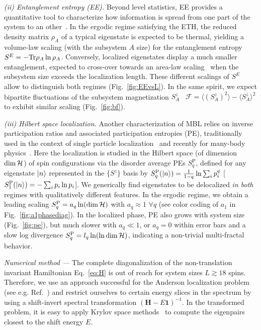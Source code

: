 \documentclass[prl,a4paper,twocolumn,groupedaddress,english,showpacs]{revtex4-1}
\begin{document}
{\it{(ii) Entanglement entropy (EE). }} Beyond level statistics, EE provides a quantitative tool to
characterize how information is spread from one part of the system to an
other~\cite{review_nandkishore}.  In the ergodic regime satisfying the ETH, the reduced density
matrix $\rho_A$  of a typical eigenstate is expected to be thermal, yielding a volume-law scaling
(with the subsystem $A$ size) for the entanglement entropy $S^E=- {\rm Tr} \rho_A \ln \rho_A$.
Conversely, localized eigenstates display a much smaller entanglement, expected to cross-over
towards an area-law scaling~\cite{review_nandkishore,bauer_area_2013} when the subsystem size
exceeds the localization length. These different scalings of $S^E$ allow to distinguish both regimes
(Fig.~\ref{fig:EEvsL}). In the same spirit, we expect bipartite fluctuations of the subsystem
magnetization $S^z_A$~\cite{song_bipartite_2012} $\mathcal{F}=\langle \left( S^z_A \right)^2 \rangle
- \langle S^z_A \rangle^2$ to exhibit similar scaling (Fig.~\ref{fig:bf}).

{\it{(iii) Hilbert space localization.}} Another characterization of MBL relies on inverse participation ratios and associated participation
entropies (PE), traditionally used in the context of single particle
localization~\cite{bell_dynamics_1972,wegner_inverse_1980,rodriguez_multifractal_2011} and recently
for many-body physics~\cite{luitz_universal_2014,luitz_participation_2014}. Here the localization is studied in the Hilbert
space (of dimension $\dim{\cal H}$) of spin configurations via the disorder average PEs
${S^\text{P}_q}$, defined for any eigenstate $|n\rangle$ represented in the $\{S^z\}$  basis by
$S^\text{P}_q(|n\rangle) = \frac{1}{1-q}\ln\sum_i p_i^{q}$ [$S^\text{P}_1(|n\rangle)=-\sum_i p_i \ln p_i$]. We generically find eigenstates
    to be delocalized  {\it{in both}} regimes with qualitatively different features. In the ergodic
    regime, we obtain a leading scaling $S^{\rm P}_q=a_q\ln ( { \dim{\cal H} })$ with $a_q\approx 1$
    $\forall q$ (see color coding of $a_1$ in Fig.~\ref{fig:a1phasediag}). In the localized phase,
    PE also grows with system size (Fig.~\ref{fig:pe}), but much slower with $a_q\ll 1$, or $a_q =0$
    within error bars and a slow log divergence $S^{\rm P}_q = l_q \ln ( \ln{ \dim{\cal H} } )
    $, indicating a non-trivial multi-fractal behavior.
    
\textit{Numerical method ---} 
The complete diagonalization of the non-translation invariant
Hamiltonian Eq.~\eqref{eq:H} is out of reach for system sizes $L \gtrsim18$ spins. 
Therefore, we use an approach successful for the Anderson localization problem (see e.g.
Ref.~) and restrict ourselves to certain energy slices in
the spectrum by using a shift-invert spectral transformation $(\mathbf{H}-E\mathbf{1})^{-1}$. In the transformed problem, it is easy to apply Krylov space
methods~\cite{hernandez_slepc_2005} to compute the eigenpairs closest to the shift energy $E$.
\end{document}
